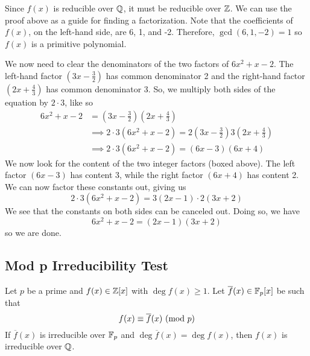 \documentclass[letterpaper]{article}
\begin{document}
\begin{mdframed}[]
    Since $f(x)$ is reducible over $\mathbb{Q}$, it must be reducible over $\mathbb{Z}$. We can use the proof above as a guide for finding a factorization. Note that the coefficients of $f(x)$, on the left-hand side, are 6, 1, and -2. Therefore, $\gcd(6, 1, -2) = 1$ so $f(x)$ is a primitive polynomial. 

    \bigskip 

    We now need to clear the denominators of the two factors of $6x^2 + x - 2$. The left-hand factor $\left(3x - \frac{3}{2}\right)$ has common denominator 2 and the right-hand factor $\left(2x + \frac{4}{3}\right)$ has common denominator 3. So, we multiply both sides of the equation by $2 \cdot 3$, like so 
    \begin{equation*}
        \begin{aligned}
            6x^2 + x - 2 &= \left(3x - \frac{3}{2}\right) \left(2x + \frac{4}{3}\right) \\ 
                &\implies 2 \cdot 3 (6x^2 + x - 2) = 2\left(3x - \frac{3}{2}\right) 3\left(2x + \frac{4}{3}\right) \\ 
                &\implies 2 \cdot 3 (6x^2 + x - 2) = \boxed{(6x - 3)(6x + 4)}
        \end{aligned}
    \end{equation*}
    We now look for the content of the two integer factors (boxed above). The left factor $(6x - 3)$ has content 3, while the right factor $(6x + 4)$ has content 2. We can now factor these constants out, giving us  
    \[2 \cdot 3 (6x^2 + x - 2) = 3(2x - 1) \cdot 2(3x + 2)\]
    We see that the constants on both sides can be canceled out. Doing so, we have 
    \[6x^2 + x - 2 = (2x - 1) (3x + 2)\] 
    so we are done. 
\end{mdframed}

\subsection{Mod p Irreducibility Test}
\begin{theorem}{}{}
    Let $p$ be a prime and $f(x) \in \mathbb{Z}[x]$ with $\deg f(x) \geq 1$. Let $\overline{f}(x) \in \mathbb{F}_{p}[x]$ be such that
    \[f(x) \equiv \overline{f}(x) \ (\mathrm{mod}\ p)\]
    If $\overline{f}(x)$ is irreducible over $\mathbb{F}_p$ and $\deg \overline{f}(x) = \deg f(x)$, then $f(x)$ is irreducible over $\mathbb{Q}$. 
\end{theorem}
\end{document}

